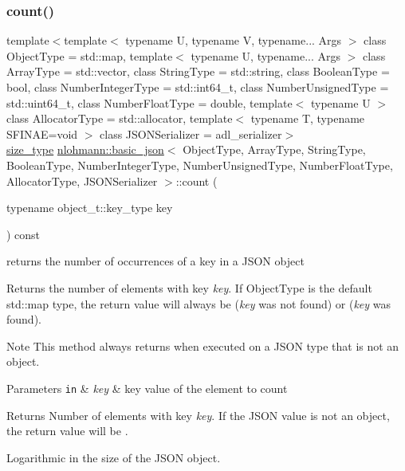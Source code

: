 \subsubsection{\texorpdfstring{count()}{count()}}
{\footnotesize\ttfamily template$<$template$<$ typename U, typename V, typename... Args $>$ class Object\+Type = std\+::map, template$<$ typename U, typename... Args $>$ class Array\+Type = std\+::vector, class String\+Type  = std\+::string, class Boolean\+Type  = bool, class Number\+Integer\+Type  = std\+::int64\+\_\+t, class Number\+Unsigned\+Type  = std\+::uint64\+\_\+t, class Number\+Float\+Type  = double, template$<$ typename U $>$ class Allocator\+Type = std\+::allocator, template$<$ typename T, typename S\+F\+I\+N\+A\+E=void $>$ class J\+S\+O\+N\+Serializer = adl\+\_\+serializer$>$ \\
\mbox{\hyperlink{classnlohmann_1_1basic__json_a39f2cd0b58106097e0e67bf185cc519b}{size\+\_\+type}} \mbox{\hyperlink{classnlohmann_1_1basic__json}{nlohmann\+::basic\+\_\+json}}$<$ Object\+Type, Array\+Type, String\+Type, Boolean\+Type, Number\+Integer\+Type, Number\+Unsigned\+Type, Number\+Float\+Type, Allocator\+Type, J\+S\+O\+N\+Serializer $>$\+::count (\begin{DoxyParamCaption}\item[{typename object\+\_\+t\+::key\+\_\+type}]{key }\end{DoxyParamCaption}) const\hspace{0.3cm}{\ttfamily [inline]}}



returns the number of occurrences of a key in a J\+S\+ON object 

Returns the number of elements with key {\itshape key}. If Object\+Type is the default {\ttfamily std\+::map} type, the return value will always be {} ({\itshape key} was not found) or {} ({\itshape key} was found).

\begin{DoxyNote}{Note}
This method always returns {} when executed on a J\+S\+ON type that is not an object.
\end{DoxyNote}

\begin{DoxyParams}[1]{Parameters}
\mbox{\tt in}  & {\em key} & key value of the element to count\\
\hline
\end{DoxyParams}
\begin{DoxyReturn}{Returns}
Number of elements with key {\itshape key}. If the J\+S\+ON value is not an object, the return value will be {}.
\end{DoxyReturn}
Logarithmic in the size of the J\+S\+ON object.

